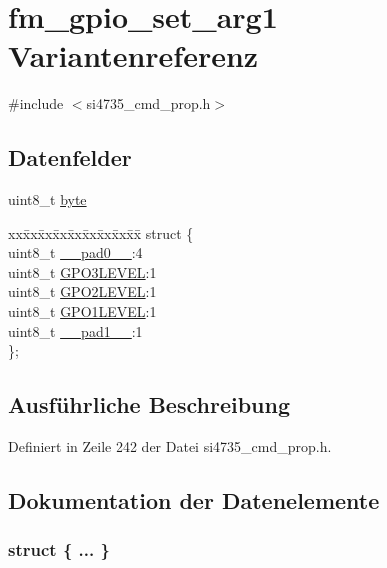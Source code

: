 \hypertarget{unionfm__gpio__set__arg1}{}\section{fm\+\_\+gpio\+\_\+set\+\_\+arg1 Variantenreferenz}
\label{unionfm__gpio__set__arg1}


{\ttfamily \#include $<$si4735\+\_\+cmd\+\_\+prop.\+h$>$}

\subsection*{Datenfelder}
\begin{DoxyCompactItemize}
\item 
uint8\+\_\+t \hyperlink{unionfm__gpio__set__arg1_a96f44d20f1dbf1c8785a7bc99a46164c}{byte}
\item 
\begin{tabbing}
xx\=xx\=xx\=xx\=xx\=xx\=xx\=xx\=xx\=\kill
struct \{\\
\>uint8\_t \hyperlink{unionfm__gpio__set__arg1_a8b4eebe79ded0459acec2f4950102ba3}{\_\_pad0\_\_}:4\\
\>uint8\_t \hyperlink{unionfm__gpio__set__arg1_af58ddf927d19d1bff07d6a0dd253d649}{GPO3LEVEL}:1\\
\>uint8\_t \hyperlink{unionfm__gpio__set__arg1_a67701d7066b2ce7e0798b18633484091}{GPO2LEVEL}:1\\
\>uint8\_t \hyperlink{unionfm__gpio__set__arg1_ad7268074c035672ea0c57aa7ba680317}{GPO1LEVEL}:1\\
\>uint8\_t \hyperlink{unionfm__gpio__set__arg1_a77f12d2e278bd5c07712648ac0df5e08}{\_\_pad1\_\_}:1\\
\}; \\

\end{tabbing}\end{DoxyCompactItemize}


\subsection{Ausführliche Beschreibung}


Definiert in Zeile 242 der Datei si4735\+\_\+cmd\+\_\+prop.\+h.



\subsection{Dokumentation der Datenelemente}
\hypertarget{unionfm__gpio__set__arg1_af1a3a9489cb17385720e366eda52930f}{}\subsubsection[{"@39}]{\setlength{\rightskip}{0pt plus 5cm}struct \{ ... \} }\label{unionfm__gpio__set__arg1_af1a3a9489cb17385720e366eda52930f}
\hypertarget{unionfm__gpio__set__arg1_a8b4eebe79ded0459acec2f4950102ba3}{}
